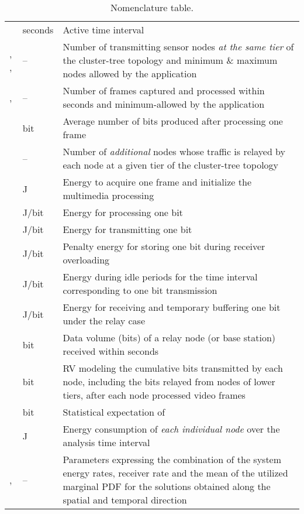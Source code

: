 \documentclass[twocolumn,english]{IEEEtran}
\providecommand{\tabularnewline}{\\}
\theoremstyle{plain}
\theoremstyle{definition}
\begin{document}
\begin{table}
\noindent \centering{}\caption{\label{tab:Nomenclature-table.1}Nomenclature table.}


\begin{tabular}{>{\centering}m{}>{\centering}m{}>{\raggedright}p{}}
\multicolumn{1}{>{\centering}m{0.15\columnwidth}}{Symbol } & \multicolumn{1}{>{\centering}m{0.07\columnwidth}}{Unit} & \multicolumn{1}{>{\raggedright}m{0.6\columnwidth}}{Definition}\tabularnewline
\midrule 
  & seconds  & Active time interval \tabularnewline
\midrule 
, ,   & --  & Number of transmitting sensor nodes \emph{at the same tier} of the
cluster-tree topology and minimum \& maximum nodes allowed by the
application \tabularnewline
\midrule 
,   & --  & Number of frames captured and processed within  seconds and minimum-allowed
by the application\tabularnewline
\midrule 
  & bit  & Average number of bits produced after processing one frame\tabularnewline
\midrule 
  & --  & Number of \emph{additional} nodes whose traffic is relayed by each
node at a given tier of the cluster-tree topology \tabularnewline
\midrule 
  & J  & Energy to acquire one frame and initialize the multimedia processing\tabularnewline
\midrule 
  & J/bit  & Energy for processing one bit\tabularnewline
\midrule 
  & J/bit  & Energy for transmitting one bit\tabularnewline
\midrule 
  & J/bit  & Penalty energy for storing one bit during receiver overloading\tabularnewline
\midrule 
  & J/bit  & Energy during idle periods for the time interval corresponding to
one bit transmission\tabularnewline
\midrule 
  & J/bit  & Energy for receiving and temporary buffering one bit under the relay
case\tabularnewline
\midrule 
  & bit  & Data volume (bits) of a relay node (or base station) received within
 seconds\tabularnewline
\midrule 


  & bit  & RV modeling the cumulative bits transmitted by each node, including
the bits relayed from  nodes of lower tiers, after each node processed
 video frames \tabularnewline
\midrule 
  & bit  & Statistical expectation of \tabularnewline
\midrule 
  & J  &  Energy consumption of \textsl{each individual node} over the analysis
time interval \tabularnewline
\midrule 
,   & --  & Parameters expressing the combination of the system energy rates,
receiver rate and the mean of the utilized marginal PDF 
for the solutions obtained along the spatial and temporal direction \tabularnewline
\bottomrule
\end{tabular}
\end{table}
\end{document}
